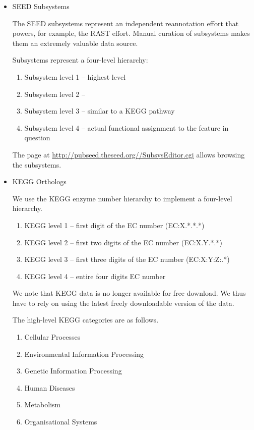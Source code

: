 \documentclass[12pt,fullpage]{report}
\begin{document}
\begin{itemize}
\item \gls{SEED} \gls{Subsystem}s

The SEED subsystems\cite{SUBSYSTEMS} represent an independent reannotation effort that powers, for example,  the RAST\cite{RAST} effort. Manual curation of subsystems makes them an extremely valuable data source.

Subsystems represent a four-level hierarchy:
\begin{enumerate}
\item Subsystem level 1 -- highest level
\item Subsystem level 2 -- 
\item Subsystem level 3 -- similar to a KEGG pathway
\item Subsystem level 4 -- actual functional assignment to the feature in question
\end{enumerate}

The page at \url{http://pubseed.theseed.org//SubsysEditor.cgi} allows browsing the subsystems.


\item KEGG Orthologs

We use the KEGG\cite{KEGG} enzyme number hierarchy to implement a four-level hierarchy.
\begin{enumerate}
\item KEGG level 1 -- first digit of the EC number (EC:X.*.*.*)
\item KEGG level 2 -- first two digits of the EC number (EC:X.Y.*.*)
\item KEGG level 3 -- first three digits of the EC number (EC:X:Y:Z:.*)
\item KEGG level 4 -- entire four digits EC number
\end{enumerate}

We note that KEGG data is no longer available for free download. We thus have to rely on using the latest freely downloadable version of the data.

The high-level KEGG categories are as follows.
\begin{enumerate}
\item Cellular Processes
\item Environmental Information Processing
\item Genetic Information Processing
\item Human Diseases
\item Metabolism
\item Organisational Systems
\end{enumerate}



\end{itemize}
\end{document}
